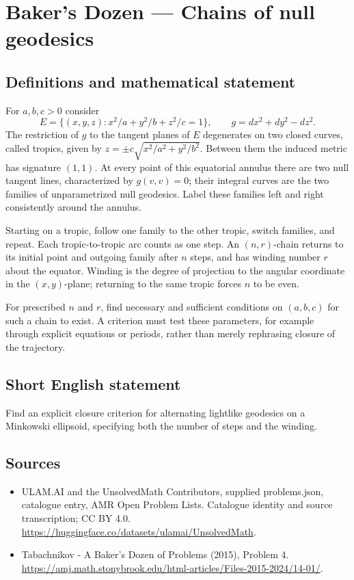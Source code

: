 \documentclass[11pt,a4paper]{article}
\begin{document}
\section*{Baker's Dozen — Chains of null geodesics}\label{statement}

\subsection{Definitions and mathematical statement}
For $a,b,c>0$ consider
\[
 E=\{(x,y,z):x^2/a+y^2/b+z^2/c=1\},\qquad
 g=dx^2+dy^2-dz^2.
\]
The restriction of $g$ to the tangent planes of $E$ degenerates on two closed
curves, called tropics, given by
$z=\pm c\sqrt{x^2/a^2+y^2/b^2}$. Between them the induced metric has signature
$(1,1)$. At every point of this equatorial annulus there are two null tangent
lines, characterized by $g(v,v)=0$; their integral curves are the two families
of unparametrized null geodesics. Label these families left and right
consistently around the annulus.

Starting on a tropic, follow one family to the other tropic, switch families,
and repeat. Each tropic-to-tropic arc counts as one step. An $(n,r)$-chain
returns to its initial point and outgoing family after $n$ steps, and has
winding number $r$ about the equator. Winding is the degree of projection
to the angular coordinate in the $(x,y)$-plane; returning to the same tropic
forces $n$ to be even.

For prescribed $n$ and $r$, find necessary and sufficient conditions on
$(a,b,c)$ for such a chain to exist. A criterion must test these parameters,
for example through explicit equations or periods, rather than merely
rephrasing closure of the trajectory.
\subsection{Short English statement}
Find an explicit closure criterion for alternating lightlike geodesics on
a Minkowski ellipsoid, specifying both the number of steps and the winding.
\subsection{Sources}
\begin{itemize}
\item[S1] ULAM.AI and the UnsolvedMath Contributors, supplied problems.json, catalogue entry, AMR Open Problem Lists. Catalogue identity and source transcription; CC BY 4.0.
\url{https://huggingface.co/datasets/ulamai/UnsolvedMath}.
\item[S2] Tabachnikov - A Baker's Dozen of Problems (2015), Problem 4. 
\url{https://amj.math.stonybrook.edu/html-articles/Files-2015-2024/14-01/}.
\end{itemize}
\end{document}
